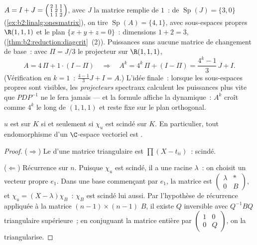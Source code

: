 \begin{example}\label{ex:b2:reduction:diagwork}
$A = I + J = \begin{psmallmatrix}2 & 1 & 1\\ 1 & 2 & 1\\ 1 & 1 &
2\end{psmallmatrix}$, avec $J$ la matrice remplie de $1$~: de
$\operatorname{Sp}(J) = \{3, 0\}$
(\cref{ex:b2:linalg:onesmatrix}), on tire $\operatorname{Sp}(A) = \{4,
1\}$, avec sous-espaces propres $\R(1,1,1)$ et le plan $\{x + y + z =
0\}$~: dimensions $1 + 2 = 3$, 
(\cref{thm:b2:reduction:diagcrit}~(2)). Puissances sans aucune matrice
de changement de base~: avec $\Pi = J/3$ le projecteur sur
$\R(1,1,1)$,
\[
A = 4\,\Pi + 1\cdot(I - \Pi)
\quad\Longrightarrow\quad
A^k = 4^k\,\Pi + (I - \Pi)
= \frac{4^k - 1}{3}\,J + I .
\]
(Vérification en $k = 1$~: $\frac{4-1}3 J + I = A$.) L'idée finale~:
lorsque les sous-espaces propres sont visibles, les \emph{projecteurs}
spectraux calculent les puissances plus vite que $PDP^{-1}$ ne le fera
jamais --- et la formule affiche la dynamique~: $A^k$ croît comme $4^k$
le long de $(1,1,1)$ et reste fixe sur le plan orthogonal.
\end{example}

\begin{theorem}[Trigonalisation]\label{thm:b2:reduction:trigonalization}
$u$ est  sur $K$ si et seulement si $\chi_u$ est scindé
sur $K$. En particulier, tout endomorphisme d'un $\C$-espace vectoriel
est .
\end{theorem}

\begin{proof}
($\Rightarrow$) Le  d'une matrice triangulaire
est $\prod(X - t_{ii})$~: scindé.

($\Leftarrow$) Récurrence sur $n$. Puisque $\chi_u$ est scindé, il a
une racine $\lambda$~: on choisit un vecteur propre $e_1$. Dans une
base commençant par $e_1$, la matrice est $\begin{pmatrix} \lambda &
\ast\\ 0 & B\end{pmatrix}$, et $\chi_u = (X - \lambda)\chi_B$~:
$\chi_B$ est scindé lui aussi. Par l'hypothèse de récurrence appliquée
à la matrice $(n-1) \times (n-1)$ $B$, il existe $Q$ inversible avec
$Q^{-1}BQ$ triangulaire supérieure~; en conjuguant la matrice entière
par $\begin{pmatrix}1 & 0\\ 0 & Q\end{pmatrix}$, on la triangularise.
\end{proof}

